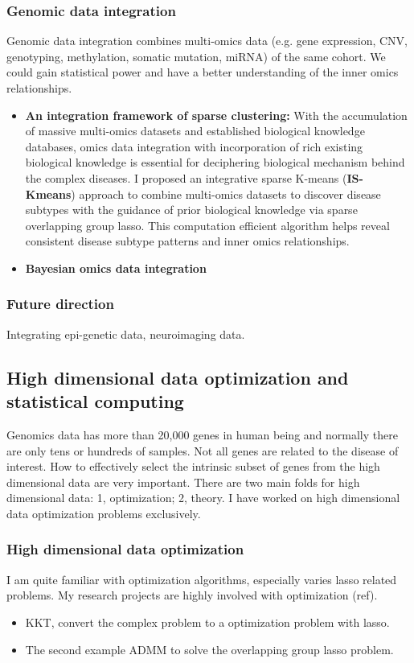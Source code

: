 \documentclass[a4paper, 10pt]{article}
\begin{document}
\subsubsection{Genomic data integration}
Genomic data integration combines multi-omics data 
(e.g. gene expression, CNV, genotyping, methylation, somatic mutation, miRNA) of the same cohort.
We could gain statistical power and have a better understanding of the inner omics relationships.
\begin{itemize}
\item \textbf{An integration framework of sparse clustering: }
With the accumulation of massive multi-omics datasets and established biological knowledge databases,
omics data integration with incorporation of rich existing biological knowledge is essential for deciphering biological mechanism behind
the complex diseases.
I proposed an integrative sparse K-means (\textbf{IS-Kmeans})\cite{ref:ISKmeans} approach to combine multi-omics datasets to discover disease subtypes with the guidance of prior biological knowledge via sparse overlapping group lasso.
This computation efficient algorithm helps reveal consistent disease subtype patterns and inner omics relationships.

\item \textbf{Bayesian omics data integration}

\end{itemize}
\subsubsection{Future direction}
Integrating epi-genetic data, neuroimaging data.


\subsection{High dimensional data optimization and statistical computing}
Genomics data has more than 20,000 genes in human being and normally there are only tens or hundreds of samples.
Not all genes are related to the disease of interest.
How to effectively select the intrinsic subset of genes from the high dimensional data are very important.
There are two main folds for high dimensional data: 1, optimization; 2, theory.
I have worked on high dimensional data optimization problems exclusively.

\subsubsection{High dimensional data optimization}
I am quite familiar with optimization algorithms, especially varies lasso related problems.
My research projects are highly involved with optimization (ref).
\begin{itemize}
\item KKT, convert the complex problem to a optimization problem with lasso.
\item The second example ADMM to solve the overlapping group lasso problem.
\end{itemize}
\end{document}
